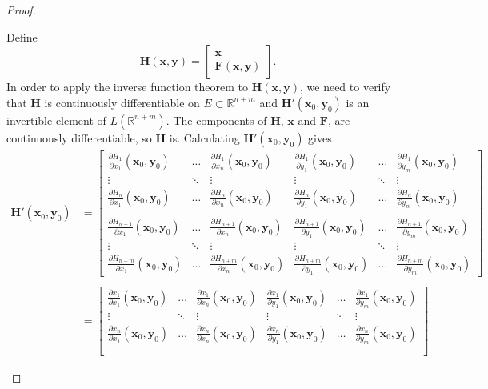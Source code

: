 \documentclass{article}
\newcommand{\R}{\mathbb{R}}
\newcommand{\x}{\mathbf{x}}
\newcommand{\F}{\mathbf{F}}
\newcommand{\y}{\mathbf{y}}
\theoremstyle{definition}
\begin{document}
\begin{proof}
\begin{enumerate}
			Define 
			$$ \mathbf H(\x,\y) = \begin{bmatrix}
				\x \\ \F(\x,\y)
			\end{bmatrix}.$$ In order to apply the inverse function theorem to $ \mathbf H(\x,\y) $, we need to verify that $ \mathbf H $ is continuously differentiable on $ E\subset \R^{n+m} $ and $ \mathbf H'(\x_0,\y_0) $ is an invertible element of $ L(\R^{n+m}) $.  The components of $ \mathbf H $, $ \x $ and $ \F $, are continuously differentiable, so $ \mathbf H $ is. Calculating $ \mathbf H'(\x_0,\y_0) $ gives 
			\begin{align*}
				\mathbf H'(\x_0,\y_0)  & = \begin{bmatrix}
					\frac{\partial H_1}{\partial x_1}(\x_0,\y_0)  & \ldots & \frac{\partial H_1}{\partial x_n}(\x_0,\y_0)  &  \frac{\partial H_1}{\partial y_1}(\x_0,\y_0)  & \ldots & \frac{\partial H_1}{\partial y_m}(\x_0,\y_0) \\ \vdots &\ddots & \vdots &\vdots & \ddots & \vdots \\ 
					\frac{\partial H_n}{\partial x_1}(\x_0,\y_0)  & \ldots & \frac{\partial H_n}{\partial x_n}(\x_0,\y_0)  &  \frac{\partial H_n}{\partial y_1}(\x_0,\y_0)  & \ldots & \frac{\partial H_n}{\partial y_m}(\x_0,\y_0) \\\\
					\frac{\partial H_{n+1}}{\partial x_1}(\x_0,\y_0)  & \ldots & \frac{\partial H_{n+1}}{\partial x_n}(\x_0,\y_0)  &  \frac{\partial H_{n+1}}{\partial y_1}(\x_0,\y_0)  & \ldots & \frac{\partial H_{n+1}}{\partial y_m}(\x_0,\y_0) \\
					\vdots &\ddots & \vdots &\vdots & \ddots & \vdots \\ 
					\frac{\partial H_{n+m}}{\partial x_1}(\x_0,\y_0)  & \ldots & \frac{\partial H_{n+m}}{\partial x_n}(\x_0,\y_0)  &  \frac{\partial H_{n+m}}{\partial y_1}(\x_0,\y_0)  & \ldots & \frac{\partial H_{n+m}}{\partial y_m}(\x_0,\y_0) 
				\end{bmatrix}\\ \\ 	 
				& = \begin{bmatrix}
					\frac{\partial x_1}{\partial x_1}(\x_0,\y_0)  & \ldots & \frac{\partial x_1}{\partial x_n}(\x_0,\y_0)  &  \frac{\partial x_1}{\partial y_1}(\x_0,\y_0)  & \ldots & \frac{\partial x_1}{\partial y_m}(\x_0,\y_0) \\ \vdots &\ddots & \vdots &\vdots & \ddots & \vdots \\ 
					\frac{\partial x_n}{\partial x_1}(\x_0,\y_0)  & \ldots & \frac{\partial x_n}{\partial x_n}(\x_0,\y_0)  &  \frac{\partial x_n}{\partial y_1}(\x_0,\y_0)  & \ldots & \frac{\partial x_n}{\partial y_m}(\x_0,\y_0) \\\\

\end{bmatrix}
\end{align*}
\end{enumerate}
\end{proof}
\end{document}
